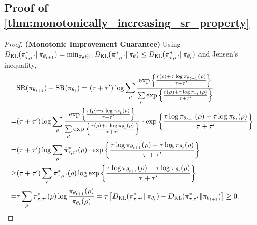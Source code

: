 \subsection{Proof of \cref{thm:monotonically_increasing_sr_property}}
\begin{proof}
	{\bf (Monotonic Improvement Guarantee)} Using $D_{\mathrm{KL}}(\bar{\pi}_{\tau,\tau^{\prime}}^* \| \pi_{\theta_{t+1}}) = \min_{\pi_\theta \in \Pi}{ D_{\mathrm{KL}}(\bar{\pi}_{\tau,\tau^{\prime}}^* \| \pi_\theta)} \le D_{\mathrm{KL}}(\bar{\pi}_{\tau,\tau^{\prime}}^* \| \pi_{\theta_t})$ and Jensen's inequality,
	\begin{equation*}
	\begin{split}
	&\text{SR}(\pi_{\theta_{t+1}}) - \text{SR}(\pi_{\theta_t}) = (\tau + \tau^{\prime}) \log{ \sum\limits_{\rho}{ \frac{  \exp\left\{ \frac{r(\rho) + \tau \log{\pi_{\theta_{t+1}}(\rho)} }{\tau + \tau^{\prime}} \right\}  }{ \sum\limits_{\rho}{  \exp\left\{ \frac{r(\rho) + \tau \log{\pi_{\theta_t}(\rho)} }{\tau + \tau^{\prime}} \right\} } }  } } \\
	=& (\tau + \tau^{\prime}) \log{ \sum\limits_{\rho}{ \frac{  \exp\left\{ \frac{r(\rho) + \tau \log{\pi_{\theta_t}(\rho)} }{\tau + \tau^{\prime}} \right\}  }{ \sum\limits_{\rho}{  \exp\left\{ \frac{r(\rho) + \tau \log{\pi_{\theta_t}(\rho)} }{\tau + \tau^{\prime}} \right\} } }  } \cdot \exp\left\{ \frac{\tau \log{\pi_{\theta_{t+1}}(\rho)} - \tau \log{\pi_{\theta_t}(\rho)} }{\tau + \tau^{\prime}} \right\} } \\
	=& (\tau + \tau^{\prime}) \log{ \sum\limits_{\rho}{ \bar{\pi}_{\tau,\tau^{\prime}}^*(\rho) } \cdot \exp\left\{ \frac{\tau \log{\pi_{\theta_{t+1}}(\rho)} - \tau \log{\pi_{\theta_t}(\rho)} }{\tau + \tau^{\prime}} \right\} } \\
	\ge& (\tau + \tau^{\prime}) \sum\limits_{\rho}{ \bar{\pi}_{\tau,\tau^{\prime}}^*(\rho) \log{ \exp\left\{ \frac{\tau \log{\pi_{\theta_{t+1}}(\rho)} - \tau \log{\pi_{\theta_t}(\rho)} }{\tau + \tau^{\prime}} \right\} } } \\
	=& \tau \sum\limits_{\rho}{ \bar{\pi}_{\tau,\tau^{\prime}}^*(\rho) \log{ \frac{\pi_{\theta_{t+1}}(\rho)}{\pi_{\theta_t}(\rho)} } } = \tau \left[ D_{\mathrm{KL}}(\bar{\pi}_{\tau,\tau^{\prime}}^* \| \pi_{\theta_t}) - D_{\mathrm{KL}}(\bar{\pi}_{\tau,\tau^{\prime}}^* \| \pi_{\theta_{t+1}})\right] \ge 0.
	\end{split}
	\end{equation*}
	

\end{proof}
